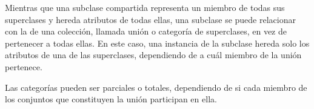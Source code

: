 Mientras que una subclase compartida representa un miembro de todas sus superclases y hereda atributos de todas ellas, una subclase se puede relacionar con la de una colección, llamada unión o categoría de superclases, en vez de pertenecer a todas ellas. En este caso, una instancia de la subclase hereda solo los atributos de una de las superclases, dependiendo de a cuál miembro de la unión pertenece.


Las categorías pueden ser parciales o totales, dependiendo de si cada miembro de los conjuntos que constituyen la unión participan en ella. 


